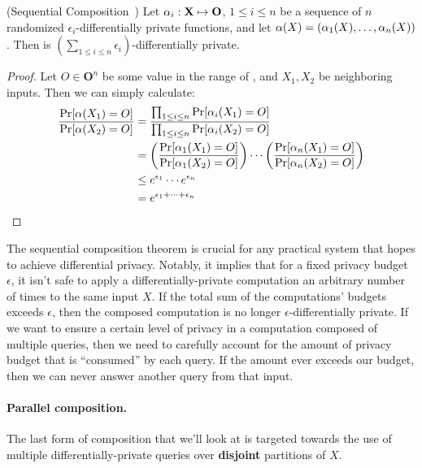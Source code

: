 \documentclass[11pt,twoside]{scrartcl}
\begin{document}
\begin{theorem}{(Sequential Composition~\cite{McSherry2009})}
Let $\alpha_i : \mathbf{X} \mapsto \mathbf{O}$, $1 \le i \le n$ be a sequence of $n$ randomized $\epsilon_i$-differentially private functions, and let $\alpha(X) = (\alpha_1(X), \ldots, \alpha_n(X))$. Then \san is $(\sum_{1 \le i \le n} \epsilon_i)$-differentially private.
\end{theorem}

\begin{proof}
Let $O \in \mathbf{O}^n$ be some value in the range of \san, and $X_1, X_2$ be neighboring inputs. Then we can simply calculate:
\begin{align*}
\frac{
  \mathrm{Pr}[\alpha(X_1) = O]
}{
  \mathrm{Pr}[\alpha(X_2) = O]
}
&=
\frac{
  \prod_{1 \le i \le n} \mathrm{Pr}[\alpha_i(X_1) = O]
}{
  \prod_{1 \le i \le n} \mathrm{Pr}[\alpha_i(X_2) = O]
}
\\
&=
\left(
\frac{
  \mathrm{Pr}[\alpha_1(X_1) = O]
}{
  \mathrm{Pr}[\alpha_1(X_2) = O]
}
\right)
\cdots
\left(
\frac{
  \mathrm{Pr}[\alpha_n(X_1) = O]
}{
  \mathrm{Pr}[\alpha_n(X_2) = O]
}
\right)
\\
&\le
e^{\epsilon_1}\cdots e^{\epsilon_n}
\\
&=
e^{\epsilon_1 + \cdots + \epsilon_n}
\end{align*}
\end{proof}

The sequential composition theorem is crucial for any practical system that hopes to achieve differential privacy. Notably, it implies that for a fixed privacy budget $\epsilon$, it isn't safe to apply a differentially-private computation an arbitrary number of times to the same input $X$. If the total sum of the computations' budgets exceeds $\epsilon$, then the composed computation is no longer $\epsilon$-differentially private. If we want to ensure a certain level of privacy in a computation composed of multiple queries, then we need to carefully account for the amount of privacy budget that is ``consumed''  by each query. If the amount ever exceeds our budget, then we can never answer another query from that input.

\paragraph{Parallel composition.} The last form of composition that we'll look at is targeted towards the use of multiple differentially-private queries over \textbf{disjoint} partitions of $X$.
\end{document}
